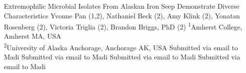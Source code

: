 \makeabstract
{
Extremophilic Microbial Isolates From Alaskan Iron Seep Demonstrate Diverse Characteristics
}
{
Yvonne Pan (1,2), Nathaniel Beck (2), Amy Klink (2), Yonatan Rosenberg (2), Victoria Triglia (2), Brandon Briggs, PhD (2)
}
{
\textsuperscript{1}Amherst College, Amherst MA, USA\\
\textsuperscript{2}University of Alaska Anchorage, Anchorage AK, USA
}
{
Submitted via email to Madi
}
{
Submitted via email to Madi
}
{
Submitted via email to Madi
}
{
Submitted via email to Madi
}

\newpage
